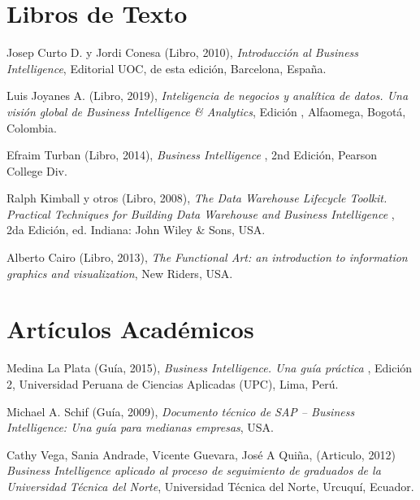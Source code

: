 \documentclass[11pt,titlepage]{report}
\begin{document}
\begin{thebibliography}{12}

\section{Libros de Texto}


 Josep Curto D. y Jordi Conesa (Libro, 2010), \textit{ Introducción al Business Intelligence}, Editorial UOC, de esta edición, Barcelona, España.

 Luis Joyanes A. (Libro, 2019), \textit{ Inteligencia de negocios y analítica de datos. Una visión global de Business Intelligence \& Analytics}, Edición , Alfaomega, Bogotá, Colombia.

 Efraim Turban (Libro, 2014), \textit{ Business Intelligence }, 2nd Edición, Pearson College Div.

 Ralph Kimball y otros (Libro, 2008), \textit{ The Data Warehouse Lifecycle Toolkit. Practical Techniques for Building Data Warehouse and Business Intelligence }, 2da Edición, ed. Indiana: John Wiley \& Sons, USA.

 Alberto Cairo (Libro, 2013), \textit{ The Functional Art: an introduction to information graphics and visualization}, New Riders, USA.

\section{Artículos Académicos}


 Medina La Plata (Guía, 2015), \textit{ Business Intelligence. Una guía práctica }, Edición 2, Universidad Peruana de Ciencias Aplicadas (UPC), Lima, Perú.
	
 Michael A. Schif (Guía, 2009), \textit{ Documento técnico de SAP – Business Intelligence: Una guía para medianas empresas}, USA.
	
 Cathy Vega, Sania Andrade, Vicente Guevara, José A  Quiña, (Articulo, 2012) \textit{ Business Intelligence aplicado al proceso de seguimiento de graduados de la Universidad Técnica del Norte}, Universidad Técnica del Norte, Urcuquí, Ecuador.
	

\end{thebibliography}
\end{document}
